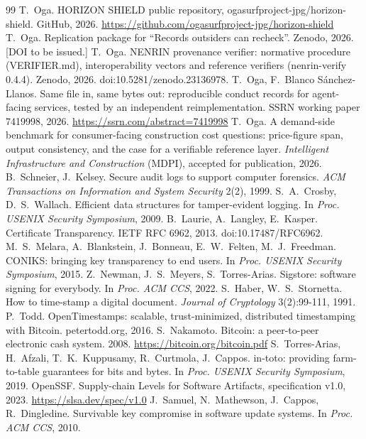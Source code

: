 \documentclass[11pt,a4paper]{article}
\begin{document}
\begin{thebibliography}{99}\small
{} T.~Oga. HORIZON SHIELD public repository, ogasurfproject-jpg/horizon-shield. GitHub, 2026. \url{https://github.com/ogasurfproject-jpg/horizon-shield}
 T.~Oga. Replication package for ``Records outsiders can recheck''. Zenodo, 2026. [DOI to be issued.]
 T.~Oga. NENRIN provenance verifier: normative procedure (VERIFIER.md), interoperability vectors and reference verifiers (nenrin-verify 0.4.4). Zenodo, 2026. doi:10.5281/zenodo.23136978.
 T.~Oga, F.~Blanco S\'anchez-Llanos. Same file in, same bytes out: reproducible conduct records for agent-facing services, tested by an independent reimplementation. SSRN working paper 7419998, 2026. \url{https://ssrn.com/abstract=7419998}
 T.~Oga. A demand-side benchmark for consumer-facing construction cost questions: price-figure span, output consistency, and the case for a verifiable reference layer. \emph{Intelligent Infrastructure and Construction} (MDPI), accepted for publication, 2026.
 B.~Schneier, J.~Kelsey. Secure audit logs to support computer forensics. \emph{ACM Transactions on Information and System Security} 2(2), 1999.
 S.~A.~Crosby, D.~S.~Wallach. Efficient data structures for tamper-evident logging. In \emph{Proc. USENIX Security Symposium}, 2009.
 B.~Laurie, A.~Langley, E.~Kasper. Certificate Transparency. IETF RFC 6962, 2013. doi:10.17487/RFC6962.
 M.~S.~Melara, A.~Blankstein, J.~Bonneau, E.~W.~Felten, M.~J.~Freedman. CONIKS: bringing key transparency to end users. In \emph{Proc. USENIX Security Symposium}, 2015.
 Z.~Newman, J.~S.~Meyers, S.~Torres-Arias. Sigstore: software signing for everybody. In \emph{Proc. ACM CCS}, 2022.
 S.~Haber, W.~S.~Stornetta. How to time-stamp a digital document. \emph{Journal of Cryptology} 3(2):99-111, 1991.
 P.~Todd. OpenTimestamps: scalable, trust-minimized, distributed timestamping with Bitcoin. petertodd.org, 2016.
 S.~Nakamoto. Bitcoin: a peer-to-peer electronic cash system. 2008. \url{https://bitcoin.org/bitcoin.pdf}
 S.~Torres-Arias, H.~Afzali, T.~K.~Kuppusamy, R.~Curtmola, J.~Cappos. in-toto: providing farm-to-table guarantees for bits and bytes. In \emph{Proc. USENIX Security Symposium}, 2019.
 OpenSSF. Supply-chain Levels for Software Artifacts, specification v1.0, 2023. \url{https://slsa.dev/spec/v1.0}
 J.~Samuel, N.~Mathewson, J.~Cappos, R.~Dingledine. Survivable key compromise in software update systems. In \emph{Proc. ACM CCS}, 2010.

\end{thebibliography}
\end{document}
